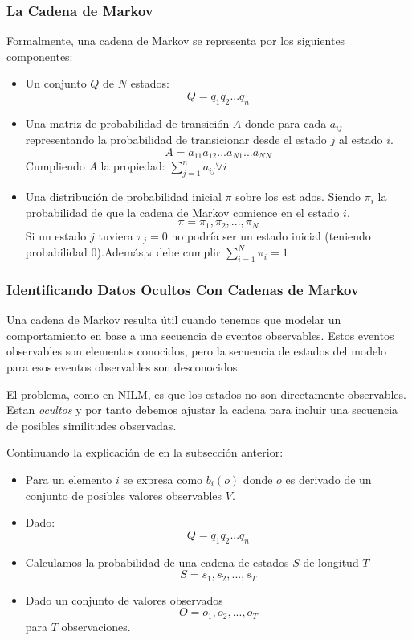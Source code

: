 \subsubsection{La Cadena de Markov}
Formalmente, una cadena de Markov se representa por los siguientes componentes:
\begin{center}
    \begin{itemize}
        \item Un conjunto $Q$ de $N$ estados: $$Q = q_1q_2...q_n$$
        \item Una matriz de probabilidad de transición $A$ donde para cada $a_{ij}$ representando la probabilidad de transicionar desde el estado $j$ al estado $i$. $$A=a_{11}a_{12}...a_{N1}...a_{NN}$$ 
        {\footnotesize Cumpliendo $A$ la propiedad: $\sum_{j=1}^n a_{ij} \forall{i}$}
        \item Una distribución de probabilidad inicial $\pi$ sobre los est
        ados. Siendo $\pi_i$ la probabilidad de que la cadena de Markov comience en el estado $i$. $$\pi=\pi_1,\pi_2, ...,\pi_N$$ 
        {\footnotesize Si un estado $j$ tuviera $\pi_j=0$ no podría ser un estado inicial (teniendo probabilidad $0$).\linebreak Además,$\pi$ debe cumplir $\sum_{i=1}^N \pi_i = 1$}
    \end{itemize} 
    \autocite{markovStandford}
\end{center}


\subsubsection{Identificando Datos Ocultos Con Cadenas de Markov}
Una cadena de Markov resulta útil cuando tenemos que modelar un comportamiento en base a una secuencia de eventos observables. 
Estos eventos observables son elementos conocidos, pero la secuencia de estados del modelo para esos eventos observables son desconocidos. 

El problema, como en NILM, es que los estados no son directamente observables. Estan \textit{ocultos} y por tanto debemos ajustar la cadena para incluir una secuencia de posibles similitudes observadas. 

Continuando la explicación de \autocite{markovStandford} en la subsección anterior:
\begin{center}
    \begin{itemize}
        \item Para un elemento $i$ se expresa como $b_i(o)$ donde $o$ es derivado de un conjunto de posibles valores observables $V$.

        \item Dado: $$Q = q_1q_2...q_n$$ 
        \item Calculamos la probabilidad de una cadena de estados $S$ de longitud $T$ $$S=s_1,s_2,...,s_{T}$$
        \item Dado un conjunto de valores observados $$O=o_1,o_2,...,o_{T}$$ para ${T}$ observaciones.
\end{itemize} 
\end{center}

